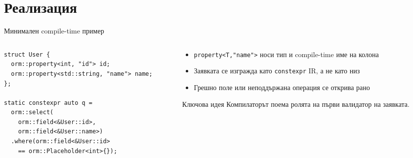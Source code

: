 \documentclass[aspectratio=169,12pt]{beamer}
\begin{document}
\section{Реализация}

\begin{frame}[fragile]{Минимален compile-time пример}
    \begin{columns}[T]
        \begin{column}{0.54\textwidth}
\begin{lstlisting}
struct User {
  orm::property<int, "id"> id;
  orm::property<std::string, "name"> name;
};

static constexpr auto q =
  orm::select(
    orm::field<&User::id>,
    orm::field<&User::name>)
  .where(orm::field<&User::id>
    == orm::Placeholder<int>{});
\end{lstlisting}
        \end{column}
        \begin{column}{0.42\textwidth}
            \begin{itemize}\small
                \item \texttt{property<T,"name">} носи тип и compile-time име на колона
                \item Заявката се изгражда като \texttt{constexpr} IR, а не като низ
                \item Грешно поле или неподдържана операция се открива рано
            \end{itemize}
            \vspace{0.2em}
            \begin{alertblock}{Ключова идея}
                {\small Компилаторът поема ролята на първи валидатор на заявката.}
            \end{alertblock}
        \end{column}
    \end{columns}
\end{frame}
\end{document}

